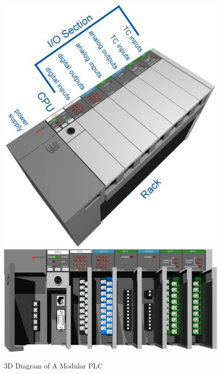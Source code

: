 \begin{figure}[htp]
    \centering
    \includegraphics[width=\imgsmlphoto]{./images/c02_plcdev.jpg}
    \includegraphics[width=\imgsmlphoto]{./images/c04_plcdev.jpg}
    \caption{3D Diagram of A Modular PLC \cite{img_c02_PlcDev,img_c04_PlcDev}}
    \label{img:plcrender_1}
\end{figure}

